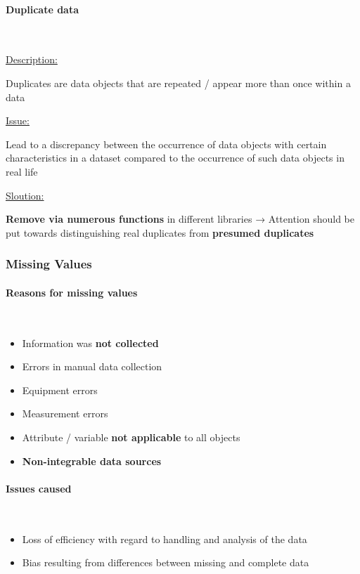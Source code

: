 \documentclass[12pt, a4paper, oneside, justified]{article}
\begin{document}
\paragraph*{Duplicate data}~{}

\underline{Description:}

Duplicates are data objects that are repeated / appear more than once within a data

\underline{Issue:}

Lead to a discrepancy between the occurrence of data objects with certain characteristics in a dataset compared to the occurrence of such data objects in real life

\underline{Sloution:}

\textbf{Remove via numerous functions} in different libraries 
→ Attention should be put towards distinguishing real duplicates from \textbf{presumed duplicates}

\subsubsection{Missing Values}

\paragraph*{Reasons for missing values}~{}

\begin{itemize}
    \item Information was \textbf{not collected}
    \item Errors in manual data collection
    \item Equipment errors
    \item Measurement errors
    \item Attribute / variable \textbf{not applicable} to all objects
    \item \textbf{Non-integrable data sources}
\end{itemize}

\paragraph*{Issues caused}~{}

\begin{itemize}
    \item Loss of efficiency with regard to handling and analysis of the data
    \item Bias resulting from differences between missing and complete data
\end{itemize}
\end{document}
